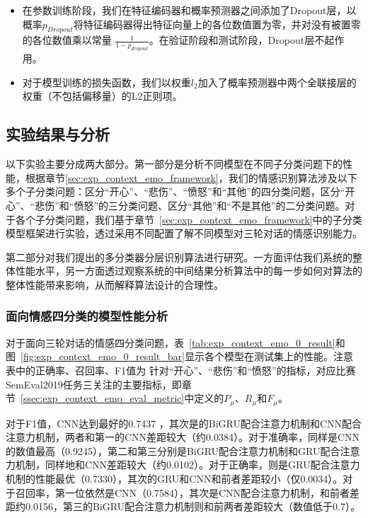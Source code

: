 \begin{itemize}
\item 在参数训练阶段，我们在特征编码器和概率预测器之间添加了Dropout层，以概率$p_{Dropout}$将特征编码器得出特征向量上的各位数值置为零，并对没有被置零的各位数值乘以常量 $\frac{1}{1-p_{dropout}}$。在验证阶段和测试阶段，Dropout层不起作用。

\item 对于模型训练的损失函数，我们以权重$l_2$加入了概率预测器中两个全联接层的权重（不包括偏移量）的L2正则项。

\end{itemize}

\subsection{实验结果与分析}

以下实验主要分成两大部分。第一部分是分析不同模型在不同子分类问题下的性能，根据章节\ref{sec:exp_context_emo_framework}，我们的情感识别算法涉及以下多个子分类问题：区分“开心”、“悲伤”、“愤怒”和“其他”的四分类问题，区分“开心”、“悲伤”和“愤怒”的三分类问题、区分“其他”和“不是其他”的二分类问题。对于各个子分类问题，我们基于章节~\ref{sec:exp_context_emo_framework}中的子分类模型框架进行实验，透过采用不同配置了解不同模型对三轮对话的情感识别能力。

第二部分对我们提出的多分类器分层识别算法进行研究。一方面评估我们系统的整体性能水平，另一方面透过观察系统的中间结果分析算法中的每一步如何对算法的整体性能带来影响，从而解释算法设计的合理性。

\subsubsection{面向情感四分类的模型性能分析}
\label{sssec:exp_context_emo_0_base}

对于面向三轮对话的情感四分类问题，表~\ref{tab:exp_context_emo_0_result}和图~\ref{fig:exp_context_emo_0_result_bar}显示各个模型在测试集上的性能。注意表中的正确率、召回率、F1值为
针对“开心”、“悲伤”和“愤怒”的指标，对应比赛SemEval2019任务三关注的主要指标，即章节~\ref{ssec:exp_context_emo_eval_metric}中定义的$P_\mu$、$R_\mu$和$F_\mu$。

对于F1值，CNN达到最好的0.7437 ，其次是的BiGRU配合注意力机制和CNN配合注意力机制，两者和第一的CNN差距较大（约0.0384）。对于准确率，同样是CNN的数值最高（0.9245），第二和第三分别是BiGRU配合注意力机制和GRU配合注意力机制，同样地和CNN差距较大（约0.0102）。对于正确率，则是GRU配合注意力机制的性能最优（0.7330），其次的GRU和CNN和前者差距较小（仅0.0034）。对于召回率，第一位依然是CNN（0.7584），其次是CNN配合注意力机制，和前者差距约0.0156，第三的BiGRU配合注意力机制则和前两者差距较大（数值低于0.7）。

